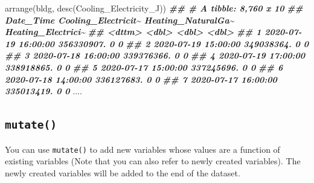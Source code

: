 \documentclass[
]{book}
\newenvironment{Shaded}{\begin{snugshade}}{\end{snugshade}}
\newcommand{\DocumentationTok}[1]{\textcolor[rgb]{0.56,0.35,0.01}{\textbf{\textit{#1}}}}
\newcommand{\FunctionTok}[1]{\textcolor[rgb]{0.00,0.00,0.00}{#1}}
\newcommand{\NormalTok}[1]{#1}
\begin{document}
\begin{Shaded}
\begin{Highlighting}[]
\FunctionTok{arrange}\NormalTok{(bldg, }\FunctionTok{desc}\NormalTok{(Cooling\_Electricity\_J))}
\DocumentationTok{\#\# \# A tibble: 8,760 x 10}
\DocumentationTok{\#\#    Date\_Time           Cooling\_Electricit\textasciitilde{} Heating\_NaturalGa\textasciitilde{} Heating\_Electrici\textasciitilde{}}
\DocumentationTok{\#\#    \textless{}dttm\textgreater{}                            \textless{}dbl\textgreater{}              \textless{}dbl\textgreater{}              \textless{}dbl\textgreater{}}
\DocumentationTok{\#\#  1 2020{-}07{-}19 16:00:00          356330907.                  0                  0}
\DocumentationTok{\#\#  2 2020{-}07{-}19 15:00:00          349038364.                  0                  0}
\DocumentationTok{\#\#  3 2020{-}07{-}18 16:00:00          339376366.                  0                  0}
\DocumentationTok{\#\#  4 2020{-}07{-}19 17:00:00          338918865.                  0                  0}
\DocumentationTok{\#\#  5 2020{-}07{-}17 15:00:00          337245696.                  0                  0}
\DocumentationTok{\#\#  6 2020{-}07{-}18 14:00:00          336127683.                  0                  0}
\DocumentationTok{\#\#  7 2020{-}07{-}17 16:00:00          335013419.                  0                  0}
\NormalTok{....}
\end{Highlighting}
\end{Shaded}

\hypertarget{mutate}{%
\subsection{\texorpdfstring{\texttt{mutate()}}{mutate()}}\label{mutate}}

You can use \texttt{mutate()} to add new variables whose values are a function of existing variables (Note that you can also refer to newly created variables). The newly created variables will be added to the end of the dataset.
\end{document}
